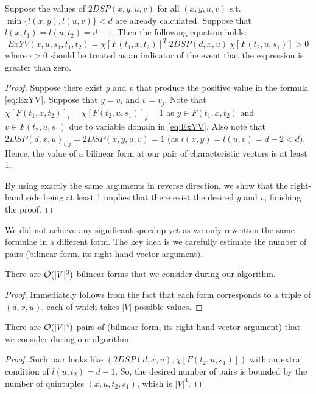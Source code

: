 \begin{proposition}
Suppose the values of $2DSP(x, y, u, v)$ for all $(x, y, u, v)$ s.t. $\min\{l(x, y), l(u, v)\} < d$ are already calculated. Suppose that $l(x, t_1) = l(u, t_2) = d - 1$. Then the following equation holds:
\begin{equation}
ExYV(x, u, s_1, t_1, t_2) = \chi[F(t_1, x, t_2)]^T~2DSP(d,x,u)~\chi[F(t_2, u, s_1)] > 0 \label{eq:ExYVbil}
\end{equation}
where $\cdot > 0$ should be treated as an indicator of the event that the expression is greater than zero.
\end{proposition}
\begin{proof}
Suppose there exist $y$ and $v$ that produce the positive value in the formula \eqref{eq:ExYV}. Suppose that $y = v_i$ and $v = v_j$. Note that $\chi[F(t_1, x, t_2)]_i = \chi[F(t_2, u, s_1)]_j = 1$ as $y \in F(t_1, x, t_2)$ and $v \in F(t_2, u, s_1)$ due to variable domain in \eqref{eq:ExYV}. Also note that $2DSP(d, x, u)_{i,j} = 2DSP(x, y, u, v) = 1$ (as $l(x, y) = l(u, v) = d - 2 < d$). Hence, the value of a bilinear form at our pair of characteristic vectors is at least 1.

By using exactly the same arguments in reverse direction, we show that the right-hand side being at least 1 implies that there exist the desired $y$ and $v$, finishing the proof. 
\end{proof}

We did not achieve any significant speedup yet as we only rewritten the same formulae in a different form. The key idea is we carefully estimate the number of pairs (bilinear form, its right-hand vector argument). 

\begin{proposition}
There are $\mathcal{O}(|V|^3)$ bilinear forms that we consider during our algorithm.
\end{proposition}
\begin{proof}
Immediately follows from the fact that each form corresponds to a triple of $(d, x, u)$, each of which takes $|V|$ possible values.
\end{proof}

\begin{proposition}
There are $\mathcal{O}(|V|^4)$ pairs of (bilinear form, its right-hand vector argument) that we consider during our algorithm.
\end{proposition}
\begin{proof}
Such pair looks like $(2DSP(d, x, u), \chi[F(t_2, u, s_1)])$ with an extra condition of $l(u, t_2) = d - 1$. So, the desired number of pairs is bounded by the number of quintuples $(x, u, t_2, s_1)$, whish is $|V|^4$.
\end{proof}

